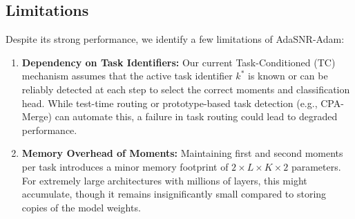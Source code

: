 \documentclass{article}
\theoremstyle{plain}
\theoremstyle{definition}
\theoremstyle{remark}
\begin{document}
\subsection{Limitations}
Despite its strong performance, we identify a few limitations of AdaSNR-Adam:
\begin{enumerate}
    \item \textbf{Dependency on Task Identifiers:} Our current Task-Conditioned (TC) mechanism assumes that the active task identifier $k^*$ is known or can be reliably detected at each step to select the correct moments and classification head. While test-time routing or prototype-based task detection (e.g., CPA-Merge) can automate this, a failure in task routing could lead to degraded performance.
    \item \textbf{Memory Overhead of Moments:} Maintaining first and second moments per task introduces a minor memory footprint of $2 \times L \times K \times 2$ parameters. For extremely large architectures with millions of layers, this might accumulate, though it remains insignificantly small compared to storing copies of the model weights.
\end{enumerate}
\end{document}
